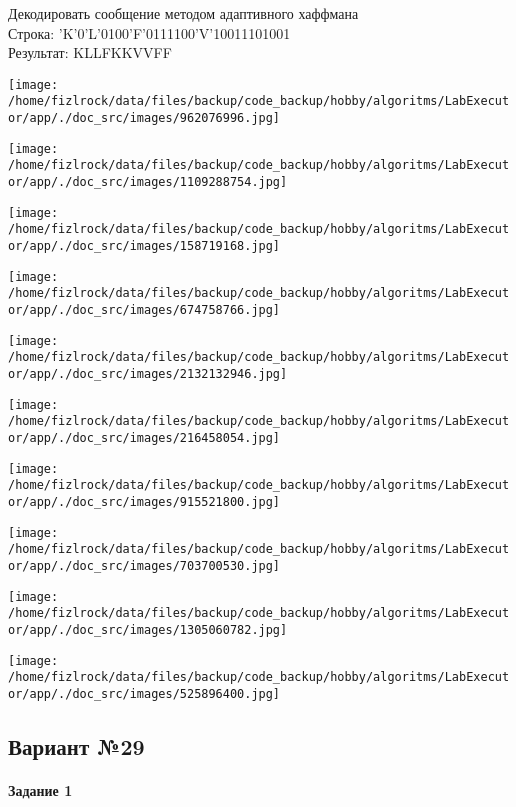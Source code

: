 \documentclass[a4paper, 12pt]{article}
\begin{document}
Декодировать сообщение методом адаптивного хаффмана \\
Строка: 
'K'0'L'0100'F'0111100'V'10011101001\\
Результат: KLLFKKVVFF

\texttt{[image: /home/fizlrock/data/files/backup/code\_backup/hobby/algoritms/LabExecutor/app/./doc\_src/images/962076996.jpg]}

\texttt{[image: /home/fizlrock/data/files/backup/code\_backup/hobby/algoritms/LabExecutor/app/./doc\_src/images/1109288754.jpg]}

\texttt{[image: /home/fizlrock/data/files/backup/code\_backup/hobby/algoritms/LabExecutor/app/./doc\_src/images/158719168.jpg]}

\texttt{[image: /home/fizlrock/data/files/backup/code\_backup/hobby/algoritms/LabExecutor/app/./doc\_src/images/674758766.jpg]}

\texttt{[image: /home/fizlrock/data/files/backup/code\_backup/hobby/algoritms/LabExecutor/app/./doc\_src/images/2132132946.jpg]}

\texttt{[image: /home/fizlrock/data/files/backup/code\_backup/hobby/algoritms/LabExecutor/app/./doc\_src/images/216458054.jpg]}

\texttt{[image: /home/fizlrock/data/files/backup/code\_backup/hobby/algoritms/LabExecutor/app/./doc\_src/images/915521800.jpg]}

\texttt{[image: /home/fizlrock/data/files/backup/code\_backup/hobby/algoritms/LabExecutor/app/./doc\_src/images/703700530.jpg]}

\texttt{[image: /home/fizlrock/data/files/backup/code\_backup/hobby/algoritms/LabExecutor/app/./doc\_src/images/1305060782.jpg]}

\texttt{[image: /home/fizlrock/data/files/backup/code\_backup/hobby/algoritms/LabExecutor/app/./doc\_src/images/525896400.jpg]}
\pagebreak
\subsection{Вариант №29}
\paragraph{Задание 1}
\end{document}
